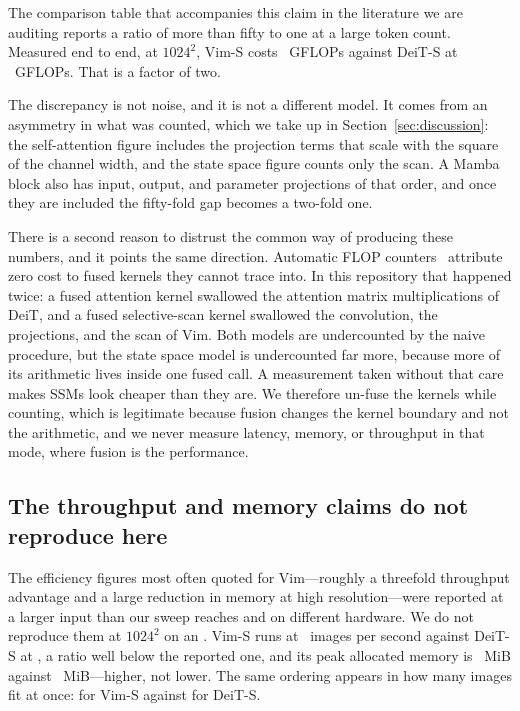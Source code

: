 The comparison table that accompanies this claim in the literature we are
auditing reports a ratio of more than fifty to one at a large token count.
Measured end to end, at $1024^2$, Vim-S costs \VimFlopsHigh~GFLOPs against
DeiT-S at \DeitFlopsHigh~GFLOPs. That is a factor of two.

The discrepancy is not noise, and it is not a different model. It comes from
an asymmetry in what was counted, which we take up in
Section~\ref{sec:discussion}: the self-attention figure includes the
projection terms that scale with the square of the channel width, and the
state space figure counts only the scan. A Mamba block also has input,
output, and parameter projections of that order, and once they are included
the fifty-fold gap becomes a two-fold one.

There is a second reason to distrust the common way of producing these
numbers, and it points the same direction. Automatic FLOP counters~\citep{fvcore} attribute
zero cost to fused kernels they cannot trace into. In this repository that
happened twice: a fused attention kernel swallowed the attention matrix
multiplications of DeiT, and a fused selective-scan kernel swallowed the
convolution, the projections, and the scan of Vim. Both models are
undercounted by the naive procedure, but the state space model is undercounted
far more, because more of its arithmetic lives inside one fused call. A
measurement taken without that care makes SSMs look cheaper than they are.
We therefore un-fuse the kernels while counting, which is legitimate because
fusion changes the kernel boundary and not the arithmetic, and we never
measure latency, memory, or throughput in that mode, where fusion is the
performance.

\subsection{The throughput and memory claims do not reproduce here}

The efficiency figures most often quoted for Vim---roughly a threefold
throughput advantage and a large reduction in memory at high
resolution---were reported at a larger input than our sweep reaches and on
different hardware. We do not reproduce them at $1024^2$ on an
\GpuName{}. Vim-S runs at \VimImgsHigh~images per second against DeiT-S at
\DeitImgsHigh{}, a ratio well below the reported one, and its peak allocated
memory is \VimPeakHigh~MiB against \DeitPeakHigh~MiB---higher, not lower.
The same ordering appears in how many images fit at once:
\VimMaxBatchHigh{} for Vim-S against \DeitMaxBatchHigh{} for DeiT-S.


